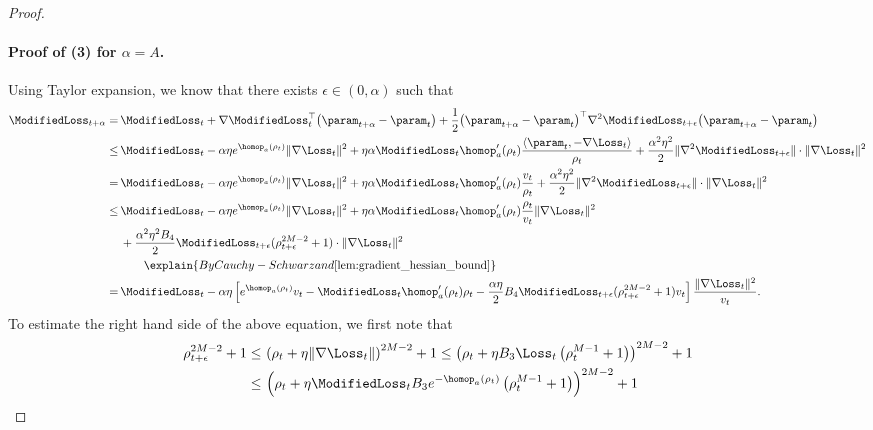 \begin{proof}
    \paragraph{Proof of (3) for $\alpha = A$.} Using Taylor expansion, we know that there exists $\epsilon \in (0, \alpha)$ such that
    \begin{align*}
       \ModifiedLoss_{t+\alpha} = \, & \ModifiedLoss_t +  \nabla \ModifiedLoss_t^\top \big(\param_{t+\alpha} - \param_t\big)  + \frac{1 }{2} \big(\param_{t+\alpha} - \param_t\big)^\top \nabla^2 \ModifiedLoss_{t+\epsilon} \big(\param_{t+\alpha} - \param_t\big) \\ 
       \le \, & \ModifiedLoss_t - \alpha \eta e^{\homop_a(\rho_t)} \|\nabla \Loss_t\|^2 + \eta \alpha \ModifiedLoss_t \homop_a^\prime (\rho_t) \frac{\langle \param_t, - \nabla \Loss_t \rangle }{\rho_t} +   \frac{\alpha^2 \eta^2 }{2} \|\nabla^2 \ModifiedLoss_{t+\epsilon}\| \cdot \|\nabla \Loss_t\|^2\\ 
       = \, & \ModifiedLoss_t - \alpha \eta e^{\homop_a(\rho_t)} \|\nabla \Loss_t\|^2 + \eta \alpha \ModifiedLoss_t \homop_a^\prime (\rho_t) \frac{v_t }{\rho_t} +   \frac{\alpha^2 \eta^2 }{2} \|\nabla^2 \ModifiedLoss_{t+\epsilon}\| \cdot \|\nabla \Loss_t\|^2\\ 
       \le \, & \ModifiedLoss_t - \alpha \eta e^{\homop_a(\rho_t)} \|\nabla \Loss_t\|^2 + \eta \alpha \ModifiedLoss_t \homop_a^\prime (\rho_t) \frac{\rho_t}{v_t} \|\nabla \Loss_t\|^2 \\
       & + \frac{\alpha^2 \eta^2 B_4}{2} \ModifiedLoss_{t+\epsilon} (\rho_{t+\epsilon}^{2M - 2} + 1) \cdot \|\nabla \Loss_t\|^2\\ 
       & \qquad \explain{By Cauchy-Schwarz and \Cref{lem:gradient_hessian_bound}} \\
       = \, & \ModifiedLoss_t - \alpha \eta \left[ e^{\homop_a(\rho_t)} v_t - \ModifiedLoss_t \homop_a^\prime (\rho_t) \rho_t - \frac{\alpha  \eta}{2}  B_4 \ModifiedLoss_{t+\epsilon} (\rho_{t+\epsilon}^{2M - 2} + 1) v_t  \right] \frac{\|\nabla \Loss_t\|^2}{v_t}.
    \end{align*}
    To estimate the right hand side of the above equation, we first note that 
    \begin{align*}
        \rho_{t+\epsilon}^{2M - 2} + 1 \le \, & \left( \rho_t + \eta \| \nabla \Loss_t \| \right)^{2M - 2} + 1 \le \left( \rho_t + \eta B_3 \Loss_t \left( \rho_t^{M-1} + 1 \right) \right)^{2M - 2} + 1 \\
        \le \, & \left( \rho_t + \eta \ModifiedLoss_t B_3 e^{-\homop_a(\rho_t)} \left( \rho_t^{M-1} + 1 \right) \right)^{2M - 2} + 1 \\

\end{align*}
\end{proof}
